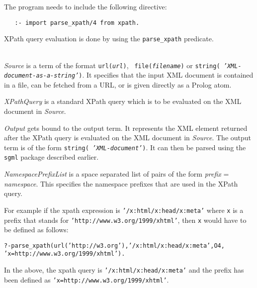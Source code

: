 The program needs to include the following directive:


\begin{verbatim}
   :- import parse_xpath/4 from xpath. 
\end{verbatim}



XPath query evaluation is done by using the {\tt parse\_xpath}  predicate.

\begin{description}
\item[{\bf parse\_xpath}{\bf (}{\it +Source, +XPathQuery, -Output, +NamespacePrefixList}{\bf )}]\mbox{}\\
  {\it Source} is a term of the format {\tt url({\it {url}})}, {\tt
    file({\it {filename}})} or {\tt string({\it
      'XML-document-as-a-string'})}. It specifies that the input XML
  document is contained in a file, can be fetched from a URL, or is given
  directly as a Prolog atom.

  {\it XPathQuery} is a standard XPath query which is to be evaluated on
  the XML document in {\em Source}.
  
  {\it Output} gets bound to the output term. It represents the XML element
  returned after the XPath query is evaluated on the XML document in
  \emph{Source}. The output term is of the form {\tt string({\it
  'XML-document'})}. It can then be parsed using the {\tt sgml} package
  described earlier. 
  
  {\it NamespacePrefixList} is a space separated list of pairs of the form
  \emph{prefix} = \emph{namespace}. This specifies the namespace
  prefixes that are used in the XPath query.


For example if the xpath expression is {\tt '/x:html/x:head/x:meta'}  where
{\tt x} 
is a prefix that stands for
{\tt 'http://www.w3.org/1999/xhtml'}, then {\tt x}  would have to be
defined as follows:

\begin{alltt}	
  ?- parse_xpath(url('http://w3.org'), '/x:html/x:head/x:meta', O4, 
                     'x=http://www.w3.org/1999/xhtml').
\end{alltt}
In the above, the xpath query is {\tt '/x:html/x:head/x:meta'}  and the
prefix has been defined as {\tt 'x=http://www.w3.org/1999/xhtml'}. 
\end{description}



